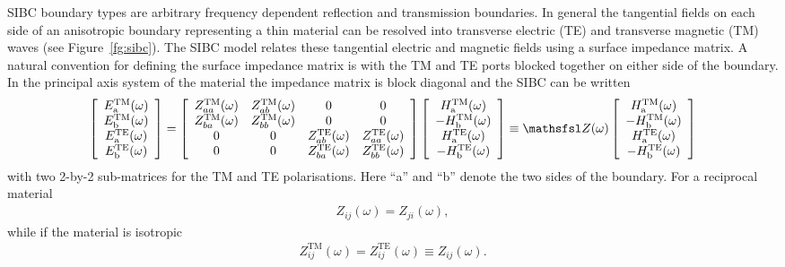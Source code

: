 \documentclass[onecolumn,a4paper]{article}
\numberwithin{equation}{section}
\begin{document}
SIBC boundary types are arbitrary frequency dependent
reflection and transmission boundaries. In general the tangential fields on each 
side of an anisotropic boundary representing a thin material can be resolved into 
transverse electric (TE) and transverse magnetic (TM) waves (see Figure~\ref{fg:sibc}). 
The SIBC model relates these tangential electric and magnetic fields 
using a surface impedance matrix. A natural convention for defining the surface 
impedance matrix is with the TM and TE ports blocked together on either side of the boundary.
In the principal axis system of the material the impedance matrix is block diagonal and
the SIBC can be written
\begin{eqnarray}
\left[
\begin{array}{c}
E^\mathrm{TM}_\mathrm{a}(\omega) \\
E^\mathrm{TM}_\mathrm{b}(\omega) \\
E^\mathrm{TE}_\mathrm{a}(\omega) \\
E^\mathrm{TE}_\mathrm{b}(\omega)
\end{array}
\right]
=
\left[
\begin{array}{cccc}
Z^\mathrm{TM}_{aa}(\omega) &Z^\mathrm{TM}_{ab}(\omega) &0 & 0 \\
Z^\mathrm{TM}_{ba}(\omega) &Z^\mathrm{TM}_{bb}(\omega) &0 & 0 \\
0 & 0 &Z^\mathrm{TE}_{ab}(\omega) &Z^\mathrm{TE}_{aa}(\omega) \\
0 & 0 &Z^\mathrm{TE}_{ba}(\omega) &Z^\mathrm{TE}_{bb}(\omega)
\end{array}
\right]
\left[
\begin{array}{c}
H^\mathrm{TM}_\mathrm{a}(\omega) \\
-H^\mathrm{TM}_\mathrm{b}(\omega) \\
H^\mathrm{TE}_\mathrm{a}(\omega) \\
-H^\mathrm{TE}_\mathrm{b}(\omega)
\end{array}
\right]
\equiv \mZ(\omega) 
\left[
\begin{array}{c}
H^\mathrm{TM}_\mathrm{a}(\omega) \\
-H^\mathrm{TM}_\mathrm{b}(\omega) \\
H^\mathrm{TE}_\mathrm{a}(\omega) \\
-H^\mathrm{TE}_\mathrm{b}(\omega)
\end{array}
\right]
\end{eqnarray}
with two 2-by-2 sub-matrices for the TM and TE polarisations. 
Here ``a'' and ``b'' denote the two sides of the boundary.
For a reciprocal material
\begin{eqnarray}
Z_{ij}(\omega) = Z_{ji}(\omega), 
\end{eqnarray}
while if the material is isotropic
\begin{eqnarray}
Z^\mathrm{TM}_{ij}(\omega) = Z^\mathrm{TE}_{ij}(\omega) \equiv Z_{ij}(\omega).
\end{eqnarray}
\end{document}

